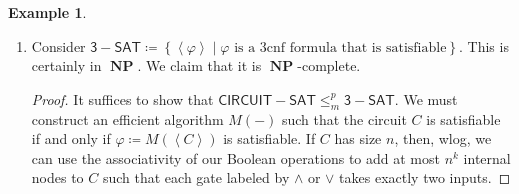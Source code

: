 \documentclass[10pt,letterpaper,cm]{nupset}
\theoremstyle{definition}
\newtheorem{exmp}[definition]{Example}
\theoremstyle{theorem}
\theoremstyle{remark}
\newcommand{\1}{\mathbf{1}}
\newcommand{\0}{\vec 0}
\DeclareMathOperator{\NP}{\mathbf{NP}}
\begin{document}
\begin{exmp} $ $
\begin{enumerate}
\item Consider $\mathsf{3{-}SAT}\coloneqq \left\{\left\langle \varphi \right\rangle \mid \varphi\text{ is a 3cnf formula that is satisfiable}\right\}$. This is certainly in $\NP$. We claim that it is $\NP$-complete.
\begin{proof}
It suffices to show that $\mathsf{CIRCUIT{-}SAT} \leq_m^p \mathsf{3{-}SAT}$. We must construct an efficient algorithm $M( -)$ such that the circuit $C$ is satisfiable  if and only if $\varphi\coloneqq M(\left\langle C \right\rangle)$ is satisfiable. If $C$ has size $n$, then, wlog, we can use the associativity of our Boolean operations to add at most $n^k$ internal nodes to $C$ such that each gate labeled by $\land$ or $\vee$ takes exactly two inputs. 


\end{proof}
\end{enumerate}
\end{exmp}
\end{document}

